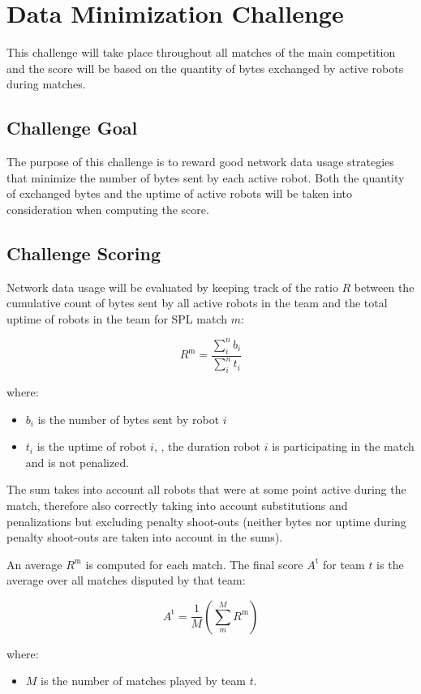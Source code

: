 \section{Data Minimization Challenge} %
This challenge will take place throughout all matches of the main competition and the score will be based on the quantity of bytes exchanged by active robots during matches. 


\subsection{Challenge Goal}
The purpose of this challenge is to reward good network data usage strategies that minimize the number of bytes sent by each active robot. Both the quantity of exchanged bytes and the uptime of active robots will be taken into consideration when computing the score.

\subsection{Challenge Scoring}
Network data usage will be evaluated by keeping track of the ratio $R$ between the cumulative count of bytes sent by all active robots in the team and the total uptime of robots in the team for SPL match $m$:

$$ R^\text{m} = \frac{\sum_{i}^n b_i}{\sum_{i}^n t_i} $$

where:
\begin{itemize}
    \item $b_i$ is the number of bytes sent by robot $i$
    \item $t_i$ is the uptime of robot $i$, \ie, the duration robot $i$ is participating in the match and is not penalized.
\end{itemize}
The sum takes into account all robots that were at some point active during the match, therefore also correctly taking into account substitutions and penalizations but excluding penalty shoot-outs (neither bytes nor uptime during penalty shoot-outs are taken into account in the sums).

An average $R^\text{m}$ is computed for each match. The final score $A^\text{t}$ for team $t$ is the average over all matches disputed by that team:

$$ A^\text{t} = \frac{1}{M} \left( \sum_{m}^M R^\text{m} \right) $$

where:
\begin{itemize}
    \item $M$ is the number of matches played by team $t$.
\end{itemize}



